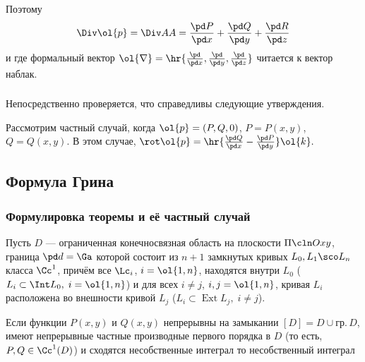 \documentclass[a4paper]{article}
\DeclareMathOperator{\Ext}{Ext}
\begin{document}
Поэтому $$\Div\ol{p}=\Div AA=\frac{\pd P}{\pd x} + \frac{\pd Q}{\pd
y} + \frac{\pd R}{\pd z}$$ и  где формальный вектор $\ol{\nabla} =
\hr{\frac{\pd}{\pd x},\frac{\pd}{\pd y},\frac{\pd}{\pd z}}$ читается
к вектор наблак.

\subsubsection{}

Непосредственно проверяется, что справедливы следующие утверждения.

\begin{theorem}
\end{theorem}

Рассмотрим частный случай, когда $\ol{p}=(P,Q,0)$, $P=P(x,y)$,
$Q=Q(x,y)$. В этом случае, $\rot\ol{p}=\hr{\frac{\pd Q}{\pd x} -
\frac{\pd P}{\pd y}}\ol{k}.$

\subsection{Формула Грина}
\subsubsection{Формулировка теоремы и её частный случай}

Пусть $D$ --- ограниченная конечносвязная область на плоскости
$\Pi\cln Oxy$, граница $\pd d=\Ga$ которой состоит из $n+1$
замкнутых кривых $L_0,L_1\sco L_n$ класса $\Cc^1$, причём все
$\Lc_i$, $i=\ol{1,n}$, находятся внутри $L_0$ ($L_i\subset\Int L_0,
\;i=\ol{1,n}$) и для всех $i\ne j$, $i,j=\ol{1,n}$, кривая $L_i$
расположена во внешности кривой $L_j$ ($L_i\subset\Ext L_j,\; i\ne
j$).


\begin{theorem}
Если функции $P(x,y)$ и $Q(x,y)$ непрерывны на замыкании $[D]=D\cup
гр.\,D$, имеют непрерывные частные производные первого порядка в $D$
(то есть, $P,Q\in\Cc^1(D)$) и сходятся несобственные интеграл
 то несобственный интеграл 
\end{theorem}
\end{document}

